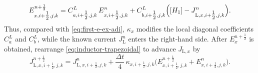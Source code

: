 \documentclass{article}
\numberwithin{equation}{section}
\numberwithin{figure}{section}
\begin{document}
\begin{equation}
    E_{x,i+\tfrac12,j,k}^{n+\frac12}
    = C_{a,i+\tfrac12,j,k}^{L}\,E_{x,i+\tfrac12,j,k}^{n}
    + C_{b,i+\tfrac12,j,k}^{L}\Bigl([H_1]-J_{\mathrm{L},x,i+\tfrac12,j,k}^{n}\Bigr).
    \label{eq:first-e-ex-adi-inductor-semi}
\end{equation}
Thus, compared with \eqref{eq:first-e-ex-adi}, $\kappa_x$ modifies the local diagonal coefficients $C_a^{L}$ and $C_b^{L}$, while the known current $J_{\mathrm{L}}^{n}$ enters the right-hand side. After $E_x^{n+\frac12}$ is obtained, rearrange \eqref{eq:inductor-trapezoidal} to advance $J_{\mathrm{L},x}$ by
\begin{equation}
    J_{\mathrm{L},x,i+\tfrac12,j,k}^{n+\frac12}
    = J_{\mathrm{L},x,i+\tfrac12,j,k}^{n}
    + \frac{\Delta t}{4}\,\kappa_{x,i+\tfrac12,j,k}\bigl(E_{x,i+\tfrac12,j,k}^{n+\frac12}+E_{x,i+\tfrac12,j,k}^{n}\bigr).
    \label{eq:inductor-j-semi}
\end{equation}
\end{document}
